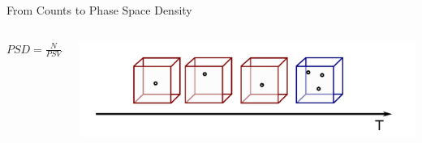 \documentclass{beamer}
\begin{document}



\begin{frame}{From Counts to Phase Space Density}
\begin{columns}
	\column[]{2cm}
	\begin{mdframed}[roundcorner=4pt,userdefinedwidth=3.cm,
		align
		=center,
		linecolor
		=black,backgroundcolor=blue!8,
		linewidth
		=1.pt]
		$PSD = \frac{N}{PSV}$
	\end{mdframed}

	\column[]{5cm}
	
	\includegraphics[scale=.4]{Pics/norm_time.pdf}
\end{columns}



\end{frame}
\end{document}
